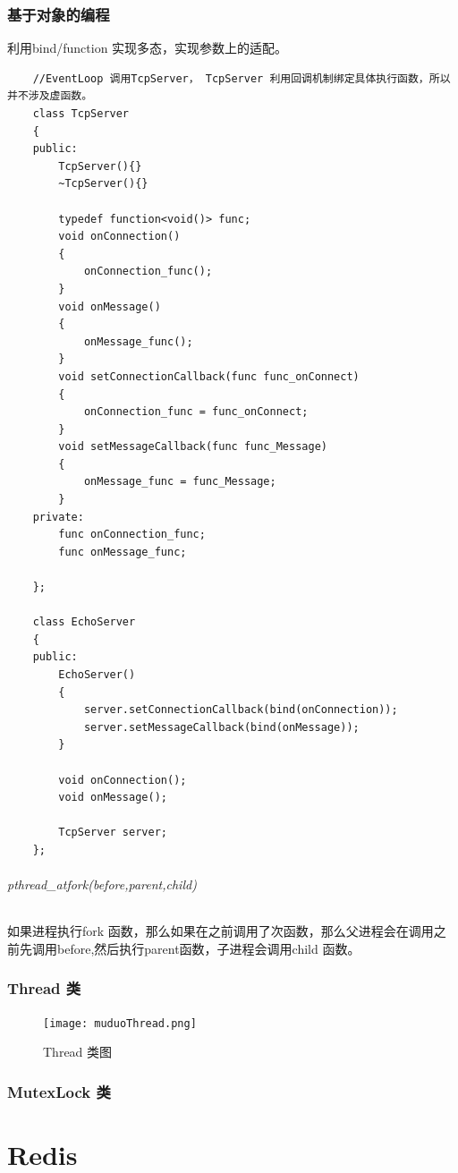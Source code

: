 \documentclass[UTF8,a4paper,8pt]{ctexbook}
\begin{document}
		\subsection{基于对象的编程}利用bind/function 实现多态，实现参数上的适配。
			\begin{lstlisting}
	//EventLoop 调用TcpServer， TcpServer 利用回调机制绑定具体执行函数，所以并不涉及虚函数。 		
	class TcpServer
	{
	public:
		TcpServer(){}
		~TcpServer(){}
		
		typedef function<void()> func;
		void onConnection()
		{
			onConnection_func();
		}
	    void onMessage()
	    {
		    onMessage_func();
	    }
	    void setConnectionCallback(func func_onConnect)
	    {
		    onConnection_func = func_onConnect;
	    }
	    void setMessageCallback(func func_Message)
	    {
		    onMessage_func = func_Message;
	    }
    private:
	    func onConnection_func;
	    func onMessage_func;
	    
	};
				
	class EchoServer
	{
	public:
		EchoServer()
		{
			server.setConnectionCallback(bind(onConnection));
			server.setMessageCallback(bind(onMessage));
		}
		
		void onConnection();
		void onMessage();
		
		TcpServer server;
	};
			\end{lstlisting}
		\subparagraph{pthread\_atfork(before,parent,child)}
			如果进程执行fork 函数，那么如果在之前调用了次函数，那么父进程会在调用之前先调用before,然后执行parent函数，子进程会调用child 函数。
			
	\subsection{Thread 类}
		\begin{figure}[ht]
			\centering
			\texttt{[image: muduoThread.png]}
			\caption{Thread 类图}
		\end{figure}
		
		
	\subsection{MutexLock 类}
	
	\subsection{}
			
\chapter{Redis}
\end{document}
